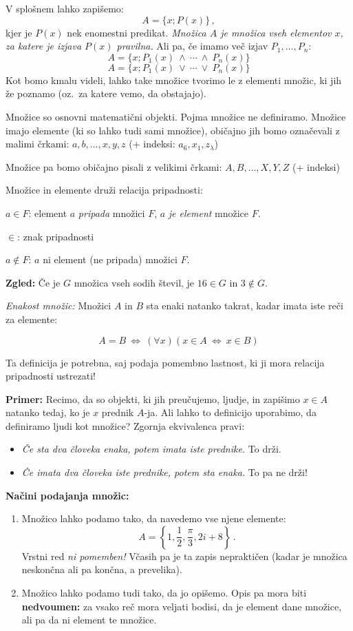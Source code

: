 \documentclass[11pt,paper=b5,footinclude,headinclude]{scrbook} %
\def\ali {{~\vee~}}
\def\inn {{~\wedge~}}
\def\cee {{~\Leftrightarrow~}}
\begin{document}
{{\begin{enumerate}
V splošnem lahko zapišemo:
$$A = \{x; P(x)\}\,,$$
kjer je $P(x)$ nek enomestni predikat.
{\em Množica $A$ je množica vseh elementov $x$, za katere je izjava $P(x)$ pravilna.}
Ali pa, če imamo več izjav $P_1,\ldots, P_n$:
$$A = \{x; P_1(x)\inn \cdots\inn P_n(x)\}$$
$$A = \{x; P_1(x)\ali \cdots\ali P_n(x)\}$$
Kot bomo kmalu videli, lahko take množice tvorimo le z elementi množic, ki jih že poznamo (oz.~za katere vemo, da obstajajo).
\end{enumerate}
}}
{
\indent Množice so osnovni matematični objekti. Pojma množice ne definiramo.
Množice imajo elemente (ki so lahko tudi sami množice), običajno jih bomo označevali z malimi črkami:
$a,b,\ldots, x,y,z$ (+ indeksi: $a_6, x_1, z_\lambda$)

\smallskip

Množice pa bomo običajno pisali z velikimi črkami: $A,B,\ldots, X,Y,Z$ (+ indeksi)

\smallskip
Množice in elemente druži relacija pripadnosti:

$a\in F$: element $a$ \emph{ pripada} množici $F$, $a$ \emph{ je element} množice $F$.

\smallskip

$\in$: znak pripadnosti

\smallskip
$a\not\in F$: $a$ ni element (ne pripada) množici $F$.

\smallskip

\textbf{ Zgled:}
Če je $G$ množica vseh sodih števil, je $16\in G$ in $3\not\in G$.


\medskip
{\em Enakost množic:} Množici $A$ in $B$ sta enaki natanko takrat, kadar imata iste reči za elemente:

$$A = B \cee (\forall x) (x\in A\cee x\in B)$$

\medskip
Ta definicija je potrebna, saj podaja pomembno lastnost, ki ji mora relacija pripadnosti ustrezati!

\textbf{ Primer:} Recimo, da so objekti, ki jih preučujemo, ljudje,
in zapišimo $x\in A$ natanko tedaj, ko je $x$ prednik $A$-ja.
Ali lahko to definicijo uporabimo, da definiramo ljudi kot množice?
Zgornja ekvivalenca pravi:
\begin{itemize}
  \item {\em Če sta dva človeka enaka, potem imata iste prednike.} To drži.
  \item {\em Če imata dva človeka iste prednike, potem sta enaka.} To pa ne drži!
\end{itemize}

\noindent\textbf{ Načini podajanja množic:}
\begin{enumerate}
  \item Množico lahko podamo tako, da navedemo vse njene elemente:
$$A = \left\{1,\frac{1}{2}, \frac{\pi}{3}, 2i+8\right\}\,.$$
Vrstni red {\em ni pomemben!}
Včasih pa je ta zapis nepraktičen (kadar je množica neskončna ali pa končna, a prevelika).
  \item Množico lahko podamo tudi tako, da jo opišemo. Opis pa mora biti \textbf{ nedvoumen:}
za vsako reč mora veljati bodisi, da je element dane množice, ali pa da ni element te množice.


\end{enumerate}}
\end{document}
